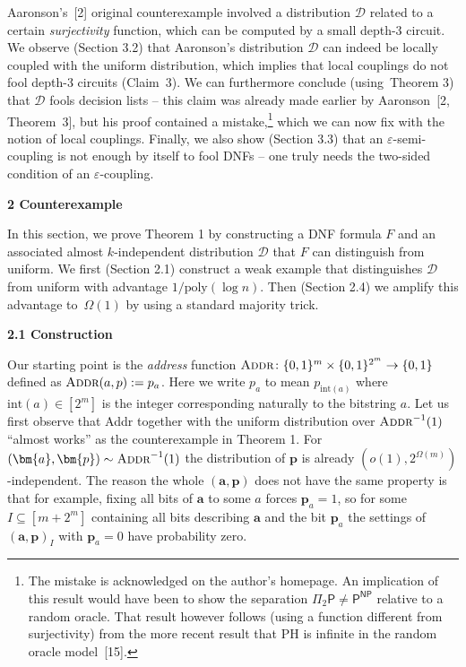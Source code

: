 Aaronson’s [2] original counterexample involved a distribution $\mathcal{D}$ related to a certain \emph{surjectivity} function, which can be computed by a small depth-3 circuit. We observe (Section 3.2) that Aaronson’s distribution $\mathcal{D}$ can indeed be locally coupled with the uniform distribution, which implies that local couplings do not fool depth-3 circuits (Claim 3). We can furthermore conclude (using Theorem 3) that $\mathcal{D}$ fools decision lists – this claim was already made earlier by Aaronson [2, Theorem 3], but his proof contained a mistake,\footnote{The mistake is acknowledged on the author’s homepage. An implication of this result would have been to show the separation $\Pi_{2}\textsf{P}\neq\textsf{P}^{\textsf{NP}}$ relative to a random oracle. That result however follows (using a function different from surjectivity) from the more recent result that PH is infinite in the random oracle model [15].} which we can now fix with the notion of local couplings. Finally, we also show (Section 3.3) that an $\varepsilon$-semi-coupling is not enough by itself to fool DNFs – one truly needs the two-sided condition of an $\varepsilon$-coupling.\par







\par\medskip\noindent\textbf{
2 Counterexample}\par




In this section, we prove Theorem 1 by constructing a DNF formula $F$ and an associated almost $k$-independent distribution $\mathcal{D}$ that $F$ can distinguish from uniform. We first (Section 2.1) construct a weak example that distinguishes $\mathcal{D}$ from uniform with advantage $1/\mathrm{poly}(\log n)$. Then (Section 2.4) we amplify this advantage to $\Omega(1)$ by using a standard majority trick.\par




\par\medskip\noindent\textbf{
2.1 Construction}\par




Our starting point is the \emph{address} function $\textsc{Addr}\colon\{0,1\}^{m}\times\{0,1\}^{2^{m}}\to\{0,1\}$ defined as $\textsc{Addr}(a,p):=p_{a}$. Here we write $p_{a}$ to mean $p_{\text{int}(a)}$ where $\text{int}(a)\in[2^{m}]$ is the integer corresponding naturally to the bitstring $a$. Let us first observe that Addr together with the uniform distribution over $\textsc{Addr}^{-1}(1)$ “almost works” as the counterexample in Theorem 1. For $(\bm{a},\bm{p})\sim\textsc{Addr}^{-1}(1)$ the distribution of $\bm{p}$ is already $(o(1),2^{\Omega(m)})$-independent. The reason the whole $(\bm{a},\bm{p})$ does not have the same property is that for example, fixing all bits of $\bm{a}$ to some $a$ forces $\bm{p}_{a}=1$, so for some $I\subseteq[m+2^{m}]$ containing all bits describing $\bm{a}$ and the bit $\bm{p}_{a}$ the settings of $(\bm{a},\bm{p})_{I}$ with $\bm{p}_{a}=0$ have probability zero.\par




